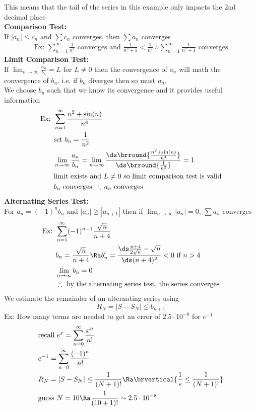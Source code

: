 This means that the tail of the series in this example only impacts the 2nd decimal place\\
\textbf{Comparison Test:}\\
If $|a_n|\leq c_n$ and $\sum c_n$ converges, then $\sum a_n$ converges
\begin{align*}
    \text{Ex: }\sum_{n=1}^\infty\frac{1}{n^2}\text{ converges and }\frac{1}{n^2+1}<\frac{1}{n^2}\,\therefore\,\sum_{n=1}^\infty\frac{1}{n^2+1}\text{ converges}
\end{align*}
\textbf{Limit Comparison Test:}\\
If $\displaystyle{\lim_{n\to\infty}\frac{a_n}{b_n}=L}$ for $L\neq 0$ then the convergence of $a_n$ will math the convergence of $b_n$. i.e. if $b_n$ diverges then so must $a_n$.\\
We choose $b_n$ such that we know its convergence and it provides useful information
\begin{align*}
    \text{Ex: }&\sum_{n=1}^\infty\frac{n^2+\sin(n)}{n^4}\\
    &\text{set }b_n=\frac{1}{n^2}\\
    &\lim_{n\to\infty}\frac{a_n}{b_n}=\lim_{n\to\infty}\frac{\ds\brround{\frac{n^2+\sin(n)}{n^4}}}{\ds\brround{\frac{1}{n^2}}}=1\\
    &\text{limit exists and }L\neq 0\text{ so limit comparison test is valid}\\
    &b_n\text{ converges }\therefore\,a_n\text{ converges}
\end{align*}
\textbf{Alternating Series Test:}\\
For $a_n=(-1)^nb_n$ and $|a_n|\geq|a_{n+1}|$ then if $\displaystyle{\lim_{n\to\infty}|a_n|}=0$, $\sum a_n$ converges
\begin{align*}
    \text{Ex: }&\sum_{n=1}^\infty(-1)^{n-1}\frac{\sqrt{n}}{n+4}\\
    &b_n=\frac{\sqrt{n}}{n+4}\Ra b_n'=\frac{\ds\frac{n+4}{2\sqrt{n}}-\sqrt{n}}{\ds(n+4)^2}<0\text{ if }n>4\\
    &\lim_{n\to\infty}b_n=0\\
    &\therefore\text{ by the alternating series test, the series converges}
\end{align*}
We estimate the remainder of an alternating series using
$$R_N=|S-S_N|\leq b_{n+1}$$
Ex: How many terms are needed to get an error of $2.5\cdot 10^{-8}$ for $e^{-1}$
\begin{align*}
    &\text{recall }e^x=\sum_{n=0}^\infty\frac{x^n}{n!}\\
    &e^{-1}=\sum_{n=0}^\infty\frac{(-1)^n}{n!}\\
    &R_N=|S-S_N|\leq\frac{1}{(N+1)!}\Ra \brvertical{\frac{1}{e}\leq \frac{1}{(N+1)!}}\\
    &\text{guess }N=10\Ra \frac{1}{(10+1)!}\sim2.5\cdot10^{-8}
\end{align*}
